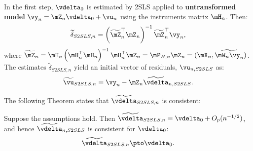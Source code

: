 \documentclass[english,12pt]{book}\usepackage[]{graphicx}\usepackage[]{xcolor}
\begin{document}
In the first step, $\vdelta_0$ is estimated by 2SLS applied to \textbf{untransformed model}  $\vy_n = \mZ_n\vdelta_0 + \vu_n$ using the instruments matrix $\mH_n$. Then:
\begin{equation*}
\widetilde{\delta}_{S2SLS, n} = \left(\widetilde{\mZ}^\top_n\mZ_n\right)^{-1}\widetilde{\mZ}^\top_n\vy_n, 
\end{equation*}
%
where $\widetilde{\mZ}_n = \mH_n\left(\mH^\top_n\mH_n\right)^{-1}\mH^\top_n\mZ_n = \mP_{H, n}\mZ_n= (\mX_n, \widetilde{\mW_n\vy_n})$. The estimates $\widetilde{\delta}_{S2SLS, n}$ yield an initial vector of residuals, $\vu_{n, S2SLS}$ as:
\begin{equation*}
\widetilde{\vu}_{S2SLS, n} = \vy_n - \mZ_n\widetilde{\vdelta}_{n, S2SLS}.
\end{equation*}

The following Theorem states that $\widetilde{\vdelta}_{S2SLS, n}$ is consistent:

\begin{theorem}\label{teo:Consistency-2sls}
Suppose the assumptions hold. Then $\widetilde{\vdelta}_{S2SLS, n} = \vdelta_0 + O_p(n^{-1/2})$, and hence $\widetilde{\vdelta}_{n, S2SLS}$ is consistent for $\vdelta_0$:
\begin{equation*}
\widetilde{\vdelta}_{S2SLS, n}\pto \vdelta_0.
\end{equation*}
\end{theorem}
\end{document}
